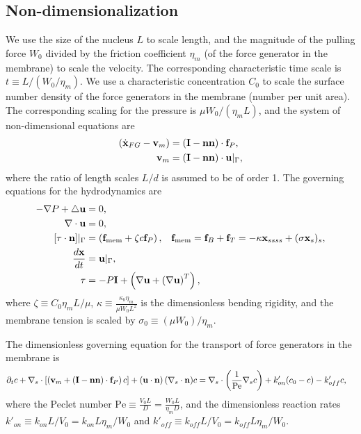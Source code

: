 \documentclass[11pt]{article}
\newcommand{\ff}{\mathbf{f}}
\newcommand{\xx}{\mathbf{x}}
\begin{document}
\subsection{Non-dimensionalization}
We use the size of the nucleus $L$ to scale length, and the magnitude of the pulling force $W_0$ divided by the friction coefficient $\eta_m$ (of the force generator in the membrane) to scale the velocity. The corresponding characteristic time scale is $t\equiv L/(W_0/\eta_m)$. We use a characteristic concentration $C_0$ to scale the surface number density of the force generators in the membrane (number per unit area). The corresponding scaling for the pressure is $\mu W_0/(\eta_m L)$, and the system of non-dimensional equations are
\begin{align}
\label{eq:x_fg}
\left(\dot{\bf x}_{FG} - {\bf v}_m\right) &= \left({\bf I}-{\bf n}{\bf n}\right)\cdot {\bf f}_{P},\\
{\bf v}_m &= \left({\bf I}-{\bf n}{\bf n}\right)\cdot {\bf u}|_{\Gamma},
 \end{align}
 where the ratio of length scales $L/d$ is assumed to be of order 1.
 The governing equations for the hydrodynamics are
 \begin{align}
-\nabla P + \triangle {\bf u} &=0,\\
\nabla\cdot{\bf u} & =0,\\
 \left[ \tau\cdot{\bf n}\right]\rvert_{\Gamma} &= \left({\bf f}_{\text{mem}} + \zeta c {\bf f}_P\right),\;\;\; \ff_{\text{mem}} = \ff_B + \ff_T = -\kappa \xx_{ssss} + (\sigma \xx_s)_s, \\
\label{eq:kinematics}
\frac{d{\bf x}}{dt} &= {\bf u}\rvert_{\Gamma},\\
\tau &= -P {\bf I} + \left(\nabla {\bf u} + \left(\nabla {\bf u}\right)^T\right),
\end{align}
where $\zeta\equiv C_0 \eta_m L/\mu$, $\kappa \equiv \frac{\kappa_b \eta_m}{\mu W_0 L^2}$ is the dimensionless bending rigidity, and the membrane tension is scaled by $\sigma_0 \equiv (\mu W_0)/\eta_m$.

The dimensionless governing equation for the transport of force generators in the membrane is
 \begin{align}
 \label{eq:c}
\partial_t c + \nabla_s\cdot \left[ \left({\bf v}_m + \left({\bf I}-{\bf n}{\bf n}\right)\cdot {\bf f}_{P}\right)c\right] + \left({\bf u}\cdot{\bf n}\right) (\nabla_s \cdot{\bf n}) c &= \nabla_s\cdot\left(\frac{1}{\mbox{Pe}}\nabla_s c\right) + k'_{on}(c_0-c) -k'_{off}c,
\end{align}
where the Peclet number $\mbox{Pe}\equiv \frac{V_0 L}{D}=\frac{W_0 L}{\eta_m D}$, and the dimensionless reaction rates
$k'_{on} \equiv k_{on} L/V_0= k_{on} L\eta_m/W_0$ and $k'_{off} \equiv k_{off} L/V_0 = k_{off} L\eta_m/W_0$.
\end{document}
